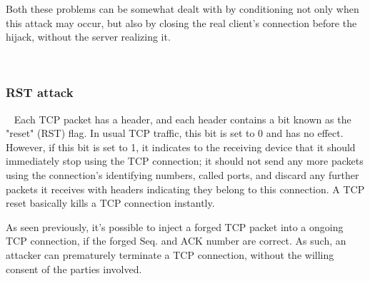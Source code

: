 Both these problems can be somewhat dealt with by conditioning not only 
when this attack may occur, but also by closing the real client's connection 
before the hijack, without the server realizing it.

~
\subsubsection{RST attack}

~\newline
Each TCP packet has a header, and each header contains a bit known as the 
"reset" (RST) flag. 
In usual TCP traffic, this bit is set to 0 and has no effect.
However, if this bit is set to 1, it indicates to the receiving device that 
it should immediately stop using the TCP connection; 
it should not send any more packets using the connection's identifying numbers, 
called ports, and discard any further packets it receives with headers 
indicating they belong to this connection. 
A TCP reset basically kills a TCP connection instantly. 

As seen previously, it's possible to inject a forged TCP packet into a ongoing 
TCP connection, if the forged Seq. and ACK number are correct. 
As such, an attacker can prematurely terminate a TCP connection, without the 
willing consent of the parties involved.


